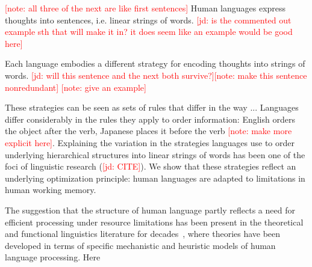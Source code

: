 \documentclass[12pt]{article}
\newcommand{\jd}[1]{\textcolor{Red}{[jd: #1]}}
\newcommand{\note}[1]{\textcolor{Red}{[note: #1]}}
\begin{document}





\note{all three of the next are like first sentences}
Human languages express thoughts into sentences, i.e. linear strings of words. 
\jd{is the commented out example sth that will make it in? it does seem like an example would be good here}

Each language embodies a different strategy for encoding thoughts into strings of words. \jd{will this sentence and the next both survive?}\note{make this sentence nonredundant}
\note{give an example}

These strategies can be seen as sets of rules that differ in the way ...
Languages differ considerably in the rules they apply to order information: English orders the object after the verb, Japanese places it before the verb \note{make more explicit here}.
Explaining the variation in the strategies languages use to  order underlying hierarchical structures into linear strings of words has been one of the foci of linguistic research (\jd{CITE}).
We show that these strategies reflect an underlying optimization principle: human languages are adapted to limitations in human working memory.

The suggestion that the structure of human language partly reflects a need for efficient processing under resource limitations has been present in the theoretical and functional linguistics literature for decades~\cite{berwick1984grammatical,hawkins1994performance}, where theories have been developed in terms of specific mechanistic and heuristic models of human language processing.
Here 
\end{document}
